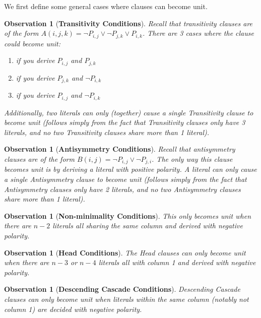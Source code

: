 \documentclass[10pt,a4paper]{article}
\newtheorem{observation}[theorem]{Observation}
\begin{document}
We first define some general cases where clauses can become unit. 
\begin{observation}[\bf Transitivity Conditions]
Recall that transitivity clauses are of the form $A(i, j, k) = \neg P_{i, j} \lor \neg P_{j, k} \lor P_{i, k}$. There are 3 cases where the clause could become unit: 
\begin{enumerate}
    \item if you derive $P_{i, j}$ and $P_{j, k}$
    \item if you derive $P_{j, k}$ and $\neg P_{i, k}$
    \item if you derive $P_{i, j}$ and $\neg P_{i, k}$
\end{enumerate}

Additionally, two literals can only (together) cause a single Transitivity clause to become unit (follows simply from the fact that Transitivity clauses only have 3 literals, and no two Transitivity clauses share more than 1 literal). 
\end{observation}

\begin{observation} [\bf Antisymmetry Conditions]
Recall that antisymmetry clauses are of the form $B(i, j) = \neg P_{i, j} \lor \neg P_{j, i}$. The only way this clause becomes unit is by deriving a literal with positive polarity. A literal can only cause a single Antisymmetry clause to become unit (follows simply from the fact that Antisymmetry clauses only have 2 literals, and no two Antisymmetry clauses share more than 1 literal). 
\end{observation}

\begin{observation} [\bf Non-minimality Conditions]
This only becomes unit when there are $n - 2$ literals all sharing the same column and derived with negative polarity.
\end{observation}

\begin{observation} [\bf Head Conditions]
The Head clauses can only become unit when there are $n - 3$ or $n - 4$ literals all with column 1 and derived with negative polarity.
\end{observation}

\begin{observation} [\bf Descending Cascade Conditions]
Descending Cascade clauses can only become unit when literals within the same column (notably not column 1) are decided with negative polarity.
\end{observation}
\end{document}
